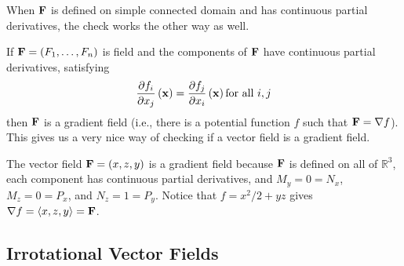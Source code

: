 When $\vector{F}$ is defined on simple connected domain and has continuous partial derivatives, the check
works the other way as well.  

If $\vector{F} = (F_1, \dots, F_n)$ is  field and the
components of $\vector{F}$ have continuous partial derivatives, satisfying 
\[\partiald{j}{f_i}{x} = \partiald{i}{f_j}{x} \text{for all } i,j\] 
then $\vector{F}$ is a gradient field (i.e.,
there is a potential function $f$ such that $\vector{F} = \nabla f$).  This
gives us a very nice way of checking if a vector field is a gradient
field.  


\begin{exa}
The vector field $\vector{F}=(x,z,y)$ is
  a gradient field because $\vector{F}$ is defined on all of
  $\mathbb{R}^3$, each component has continuous partial derivatives,
  and $M_y=0=N_x$, $M_z=0=P_x$, and $N_z=1=P_y$.  Notice that
  $f=x^2/2+yz$ gives $\nabla f = \langle x,z,y\rangle=\vector{F}$.
\end{exa}
% 
% 
%  
%   
\subsection{Irrotational Vector Fields}

